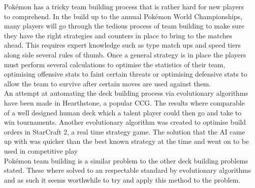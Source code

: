 \documentclass[a4paper]{article}
\newcommand{\Pokemon}{Pok\'{e}mon}
\begin{document}
\Pokemon{} has a tricky team building process that is rather hard for new players to comprehend. In the build up to the annual \Pokemon{} World Championships, many players will go through the tedious process of team building to make sure they have the right strategies and counters in place to bring to the matches ahead\cite{worldsOverview}. This requires expert knowledge such as type match ups and speed tiers along side several rules of thumb. Once a general strategy is in place the players must perform several calculations to optimise the statistics of their team, optimising offensive stats to faint certain threats or optimising defensive stats to allow the team to survive after certain moves are used against them.\\
An attempt at automating the deck building process via evolutionary algorithms have been made in Hearthstone, a popular CCG\cite{hearthstoneAI}. The results where comparable of a well designed human deck which a talent player could then go and take to win tournaments. Another evolutionary algorithm was created to optimise build orders in StarCraft 2, a real time strategy game. The solution that the AI came up with was quicker than the best known strategy at the time and went on to be used in competitive play\cite{starcraftEA}\\
\Pokemon{} team building is a similar problem to the other deck building problems stated. These where solved to an respectable standard by evolutionary algorithms and as such it seems worthwhile to try and apply this method to the problem.
\end{document}
